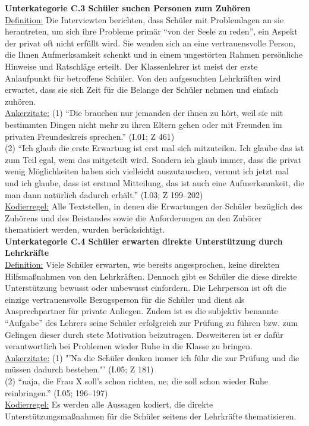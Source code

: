 \noindent
\textbf{Unterkategorie C.3 Schüler suchen Personen zum Zuhören}\\
\underline{Definition:} Die Interviewten berichten, dass Schüler mit Problemlagen an sie herantreten, um sich ihre Probleme primär "`von der Seele zu reden"', ein Aspekt der privat oft nicht erfüllt wird. Sie wenden sich an eine vertrauensvolle Person, die Ihnen Aufmerksamkeit schenkt und in einem ungestörten Rahmen persönliche Hinweise und Ratschläge erteilt. Der Klassenlehrer ist meist der erste Anlaufpunkt für betroffene Schüler. Von den aufgesuchten Lehrkräften wird erwartet, dass sie sich Zeit für die Belange der Schüler nehmen und einfach zuhören.\\
\underline{Ankerzitate:} (1) "`Die brauchen nur jemanden der ihnen zu hört, weil sie mit bestimmten Dingen nicht mehr zu ihren Eltern gehen oder mit Freunden im privaten Freundeskreis sprechen."' (I.01; Z 461)\\ (2) "`Ich glaub die erste Erwartung ist erst mal sich mitzuteilen. Ich glaube das ist zum Teil egal, wem das mitgeteilt wird. Sondern ich glaub immer, dass die privat wenig Möglichkeiten haben sich vielleicht auszutauschen, vermut ich jetzt mal und ich glaube, dass ist erstmal Mitteilung, das ist auch eine Aufmerksamkeit, die man dann natürlich dadurch erhält."' (I.03; Z 199--202)\\
\underline{Kodierregel:} Alle Textstellen, in denen die Erwartungen der Schüler bezüglich des Zuhörens und des Beistandes sowie die Anforderungen an den Zuhörer thematisiert werden, wurden berücksichtigt.\\

\noindent
\textbf{Unterkategorie C.4 Schüler erwarten direkte Unterstützung durch Lehrkräfte}\\
\underline{Definition:} Viele Schüler erwarten, wie bereits angesprochen, keine direkten Hilfsmaßnahmen von den Lehrkräften. Dennoch gibt es Schüler die diese direkte Unterstützung bewusst oder unbewusst einfordern. Die Lehrperson ist oft die einzige vertrauensvolle Bezugsperson für die Schüler und dient als Ansprechpartner für private Anliegen. Zudem ist es die subjektiv benannte "`Aufgabe"' des Lehrers seine Schüler erfolgreich zur Prüfung zu führen bzw. zum Gelingen dieser durch stete Motivation beizutragen. Desweiteren ist er dafür verantwortlich bei Problemen wieder Ruhe in die Klasse zu bringen.\\
\underline{Ankerzitate:} (1) "'Na die Schüler denken immer ich führ die zur Prüfung und die müssen dadurch bestehen."' (I.05; Z 181)\\ (2) "`naja, die Frau X soll's schon richten, ne; die soll schon wieder Ruhe reinbringen."' (I.05; 196--197)\\
\underline{Kodierregel:} Es werden alle Aussagen kodiert, die direkte Unterstützungsmaßnahmen für die Schüler seitens der Lehrkräfte thematisieren.\\

